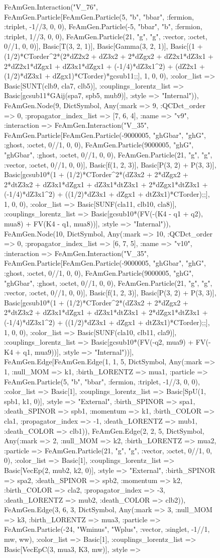 \documentclass{revtex4}
\begin{document}
\begin{figure}[!htb]
\begin{center}
{FeAmGen.Interaction("V_76", FeAmGen.Particle[FeAmGen.Particle(5, "b", "bbar", :fermion, :triplet, -1//3, 0, 0), FeAmGen.Particle(-5, "bbar", "b", :fermion, :triplet, 1//3, 0, 0), FeAmGen.Particle(21, "g", "g", :vector, :octet, 0//1, 0, 0)], Basic[T(3, 2, 1)], Basic[Gamma(3, 2, 1)], Basic[(1 + (1/2)*CTorder^2*(2*dZ2x2 + dZ3x2 + 2*dZgx2 + dZ2x1*dZ3x1 + 2*dZ2x1*dZgx1 + dZ3x1*dZgx1 + (-1/4)*dZ3x1^2) + (dZ2x1 + (1/2)*dZ3x1 + dZgx1)*CTorder)*gcsub11;;], 1, 0, 0), :color_list => Basic[SUNT(clb9, cla7, clb5)], :couplings_lorentz_list => Basic[gcsub11*GAij(spa7, spb5, mub9)], :style => "Internal")), FeAmGen.Node(9, Dict{Symbol, Any}(:mark => 9, :QCDct_order => 0, :propagator_index_list => [7, 6, 4], :name => "v9", :interaction => FeAmGen.Interaction("V_35", FeAmGen.Particle[FeAmGen.Particle(-9000005, "ghGbar", "ghG", :ghost, :octet, 0//1, 0, 0), FeAmGen.Particle(9000005, "ghG", "ghGbar", :ghost, :octet, 0//1, 0, 0), FeAmGen.Particle(21, "g", "g", :vector, :octet, 0//1, 0, 0)], Basic[f(1, 2, 3)], Basic[P(3, 2) + P(3, 3)], Basic[gcsub10*(1 + (1/2)*CTorder^2*(dZ3x2 + 2*dZgx2 + 2*dtZ3x2 + dZ3x1*dZgx1 + dZ3x1*dtZ3x1 + 2*dZgx1*dtZ3x1 + (-1/4)*dZ3x1^2) + ((1/2)*dZ3x1 + dZgx1 + dtZ3x1)*CTorder);;], 1, 0, 0), :color_list => Basic[SUNF(cla11, clb10, cla8)], :couplings_lorentz_list => Basic[gcsub10*(FV(-(K4 - q1 + q2), mua8) + FV(K4 - q1, mua8))], :style => "Internal")), FeAmGen.Node(10, Dict{Symbol, Any}(:mark => 10, :QCDct_order => 0, :propagator_index_list => [6, 7, 5], :name => "v10", :interaction => FeAmGen.Interaction("V_35", FeAmGen.Particle[FeAmGen.Particle(-9000005, "ghGbar", "ghG", :ghost, :octet, 0//1, 0, 0), FeAmGen.Particle(9000005, "ghG", "ghGbar", :ghost, :octet, 0//1, 0, 0), FeAmGen.Particle(21, "g", "g", :vector, :octet, 0//1, 0, 0)], Basic[f(1, 2, 3)], Basic[P(3, 2) + P(3, 3)], Basic[gcsub10*(1 + (1/2)*CTorder^2*(dZ3x2 + 2*dZgx2 + 2*dtZ3x2 + dZ3x1*dZgx1 + dZ3x1*dtZ3x1 + 2*dZgx1*dtZ3x1 + (-1/4)*dZ3x1^2) + ((1/2)*dZ3x1 + dZgx1 + dtZ3x1)*CTorder);;], 1, 0, 0), :color_list => Basic[SUNF(cla10, clb11, cla9)], :couplings_lorentz_list => Basic[gcsub10*(FV(-q2, mua9) + FV(-K4 + q1, mua9))], :style => "Internal"))], FeAmGen.Edge[FeAmGen.Edge(1, 1, 5, Dict{Symbol, Any}(:mark => 1, :null_MOM => k1, :birth_LORENTZ => mua1, :particle => FeAmGen.Particle(5, "b", "bbar", :fermion, :triplet, -1//3, 0, 0), :color_list => Basic[1], :couplings_lorentz_list => Basic[SpU(1, spb1, k1, 0)], :style => "External", :birth_SPINOR => spa1, :death_SPINOR => spb1, :momentum => k1, :birth_COLOR => cla1, :propagator_index => -1, :death_LORENTZ => mub1, :death_COLOR => clb1)), FeAmGen.Edge(2, 2, 5, Dict{Symbol, Any}(:mark => 2, :null_MOM => k2, :birth_LORENTZ => mua2, :particle => FeAmGen.Particle(21, "g", "g", :vector, :octet, 0//1, 0, 0), :color_list => Basic[1], :couplings_lorentz_list => Basic[VecEp(2, mub2, k2, 0)], :style => "External", :birth_SPINOR => spa2, :death_SPINOR => spb2, :momentum => k2, :birth_COLOR => cla2, :propagator_index => -3, :death_LORENTZ => mub2, :death_COLOR => clb2)), FeAmGen.Edge(3, 6, 3, Dict{Symbol, Any}(:mark => 3, :null_MOM => k3, :birth_LORENTZ => mua3, :particle => FeAmGen.Particle(-24, "Wminus", "Wplus", :vector, :singlet, -1//1, mw, ww), :color_list => Basic[1], :couplings_lorentz_list => Basic[VecEpC(3, mua3, K3, mw)], :style => }
\end{center}
\end{figure}
\end{document}
